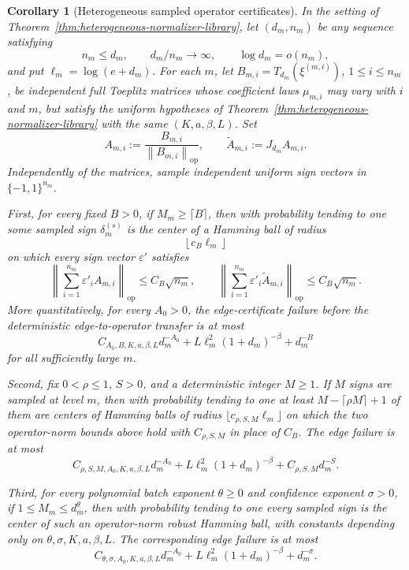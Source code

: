 \documentclass[11pt]{amsart}
\numberwithin{equation}{section}
\newtheorem{corollary}[theorem]{Corollary}
\theoremstyle{definition}
\theoremstyle{remark}
\newcommand{\op}{\mathrm{op}}
\newcommand{\norm}[1]{\left\lVert #1\right\rVert}
\newcommand{\eps}{\varepsilon}
\begin{document}
\begin{corollary}[Heterogeneous sampled operator certificates]
\label{cor:heterogeneous-normalizer-operator-certificates}
In the setting of Theorem~\ref{thm:heterogeneous-normalizer-library}, let
\((d_m,n_m)\) be any sequence satisfying
\[
  n_m\le d_m,\qquad d_m/n_m\to\infty,\qquad \log d_m=o(n_m),
\]
and put \(\ell_m=\log(e+d_m)\).  For each \(m\), let
\(B_{m,i}=T_{d_m}(\xi^{(m,i)})\), \(1\le i\le n_m\), be independent full
Toeplitz matrices whose coefficient laws \(\mu_{m,i}\) may vary with \(i\) and
\(m\), but satisfy the uniform hypotheses of
Theorem~\ref{thm:heterogeneous-normalizer-library} with the same
\((K,a,\beta,L)\).  Set
\[
  A_{m,i}:=\frac{B_{m,i}}{\norm{B_{m,i}}_{\op}},
  \qquad
  \widetilde A_{m,i}:=J_{d_m}A_{m,i}.
\]
Independently of the matrices, sample independent uniform sign vectors in
\(\{-1,1\}^{n_m}\).

First, for every fixed \(B>0\), if \(M_m\ge\lceil B\rceil\), then with
probability tending to one some sampled sign \(\delta_m^{(s)}\) is the center of
a Hamming ball of radius
\[
  \left\lfloor c_B\ell_m\right\rfloor
\]
on which every sign vector \(\eps'\) satisfies
\[
  \left\|\sum_{i=1}^{n_m}\eps'_iA_{m,i}\right\|_{\op}
  \le C_B\sqrt{n_m},
  \qquad
  \left\|\sum_{i=1}^{n_m}\eps'_i\widetilde A_{m,i}\right\|_{\op}
  \le C_B\sqrt{n_m}.
\]
More quantitatively, for every \(A_0>0\), the edge-certificate failure before
the deterministic edge-to-operator transfer is at most
\[
  C_{A_0,B,K,a,\beta,L}d_m^{-A_0}
  +L\ell_m^2(1+d_m)^{-\beta}
  +d_m^{-B}
\]
for all sufficiently large \(m\).

Second, fix \(0<\rho\le1\), \(S>0\), and a deterministic integer \(M\ge1\).
If \(M\) signs are sampled at level \(m\), then with probability tending to one
at least \(M-\lceil\rho M\rceil+1\) of them are centers of Hamming balls of
radius \(\lfloor c_{\rho,S,M}\ell_m\rfloor\) on which the two operator-norm
bounds above hold with \(C_{\rho,S,M}\) in place of \(C_B\).  The edge failure is
at most
\[
  C_{\rho,S,M,A_0,K,a,\beta,L}d_m^{-A_0}
  +L\ell_m^2(1+d_m)^{-\beta}
  +C_{\rho,S,M}d_m^{-S}.
\]

Third, for every polynomial batch exponent \(\theta\ge0\) and confidence
exponent \(\sigma>0\), if \(1\le M_m\le d_m^\theta\), then with probability
tending to one every sampled sign is the center of such an operator-norm robust
Hamming ball, with constants depending only on
\(\theta,\sigma,K,a,\beta,L\).  The corresponding edge failure is at most
\[
  C_{\theta,\sigma,A_0,K,a,\beta,L}d_m^{-A_0}
  +L\ell_m^2(1+d_m)^{-\beta}
  +d_m^{-\sigma}.
\]


\end{corollary}
\end{document}

